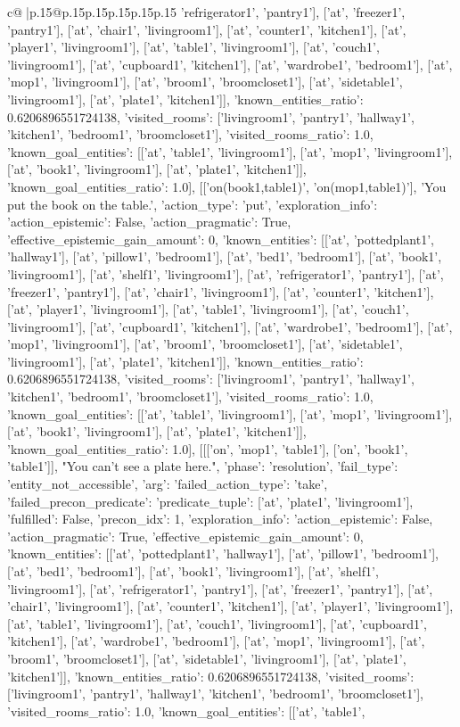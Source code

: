 \documentclass{article}
\begin{document}
{\begin{supertabular}{c@{$\;$}|p{.15\linewidth}@{}p{.15\linewidth}p{.15\linewidth}p{.15\linewidth}p{.15\linewidth}p{.15\linewidth}}
{{{'refrigerator1', 'pantry1'], ['at', 'freezer1', 'pantry1'], ['at', 'chair1', 'livingroom1'], ['at', 'counter1', 'kitchen1'], ['at', 'player1', 'livingroom1'], ['at', 'table1', 'livingroom1'], ['at', 'couch1', 'livingroom1'], ['at', 'cupboard1', 'kitchen1'], ['at', 'wardrobe1', 'bedroom1'], ['at', 'mop1', 'livingroom1'], ['at', 'broom1', 'broomcloset1'], ['at', 'sidetable1', 'livingroom1'], ['at', 'plate1', 'kitchen1']], 'known_entities_ratio': 0.6206896551724138, 'visited_rooms': ['livingroom1', 'pantry1', 'hallway1', 'kitchen1', 'bedroom1', 'broomcloset1'], 'visited_rooms_ratio': 1.0, 'known_goal_entities': [['at', 'table1', 'livingroom1'], ['at', 'mop1', 'livingroom1'], ['at', 'book1', 'livingroom1'], ['at', 'plate1', 'kitchen1']], 'known_goal_entities_ratio': 1.0}}], [['on(book1,table1)', 'on(mop1,table1)'], 'You put the book on the table.', {'action_type': 'put', 'exploration_info': {'action_epistemic': False, 'action_pragmatic': True, 'effective_epistemic_gain_amount': 0, 'known_entities': [['at', 'pottedplant1', 'hallway1'], ['at', 'pillow1', 'bedroom1'], ['at', 'bed1', 'bedroom1'], ['at', 'book1', 'livingroom1'], ['at', 'shelf1', 'livingroom1'], ['at', 'refrigerator1', 'pantry1'], ['at', 'freezer1', 'pantry1'], ['at', 'chair1', 'livingroom1'], ['at', 'counter1', 'kitchen1'], ['at', 'player1', 'livingroom1'], ['at', 'table1', 'livingroom1'], ['at', 'couch1', 'livingroom1'], ['at', 'cupboard1', 'kitchen1'], ['at', 'wardrobe1', 'bedroom1'], ['at', 'mop1', 'livingroom1'], ['at', 'broom1', 'broomcloset1'], ['at', 'sidetable1', 'livingroom1'], ['at', 'plate1', 'kitchen1']], 'known_entities_ratio': 0.6206896551724138, 'visited_rooms': ['livingroom1', 'pantry1', 'hallway1', 'kitchen1', 'bedroom1', 'broomcloset1'], 'visited_rooms_ratio': 1.0, 'known_goal_entities': [['at', 'table1', 'livingroom1'], ['at', 'mop1', 'livingroom1'], ['at', 'book1', 'livingroom1'], ['at', 'plate1', 'kitchen1']], 'known_goal_entities_ratio': 1.0}}], [[['on', 'mop1', 'table1'], ['on', 'book1', 'table1']], "You can't see a plate here.", {'phase': 'resolution', 'fail_type': 'entity_not_accessible', 'arg': {'failed_action_type': 'take', 'failed_precon_predicate': {'predicate_tuple': ['at', 'plate1', 'livingroom1'], 'fulfilled': False, 'precon_idx': 1}}, 'exploration_info': {'action_epistemic': False, 'action_pragmatic': True, 'effective_epistemic_gain_amount': 0, 'known_entities': [['at', 'pottedplant1', 'hallway1'], ['at', 'pillow1', 'bedroom1'], ['at', 'bed1', 'bedroom1'], ['at', 'book1', 'livingroom1'], ['at', 'shelf1', 'livingroom1'], ['at', 'refrigerator1', 'pantry1'], ['at', 'freezer1', 'pantry1'], ['at', 'chair1', 'livingroom1'], ['at', 'counter1', 'kitchen1'], ['at', 'player1', 'livingroom1'], ['at', 'table1', 'livingroom1'], ['at', 'couch1', 'livingroom1'], ['at', 'cupboard1', 'kitchen1'], ['at', 'wardrobe1', 'bedroom1'], ['at', 'mop1', 'livingroom1'], ['at', 'broom1', 'broomcloset1'], ['at', 'sidetable1', 'livingroom1'], ['at', 'plate1', 'kitchen1']], 'known_entities_ratio': 0.6206896551724138, 'visited_rooms': ['livingroom1', 'pantry1', 'hallway1', 'kitchen1', 'bedroom1', 'broomcloset1'], 'visited_rooms_ratio': 1.0, 'known_goal_entities': [['at', 'table1', }}}
\end{supertabular}}
\end{document}
